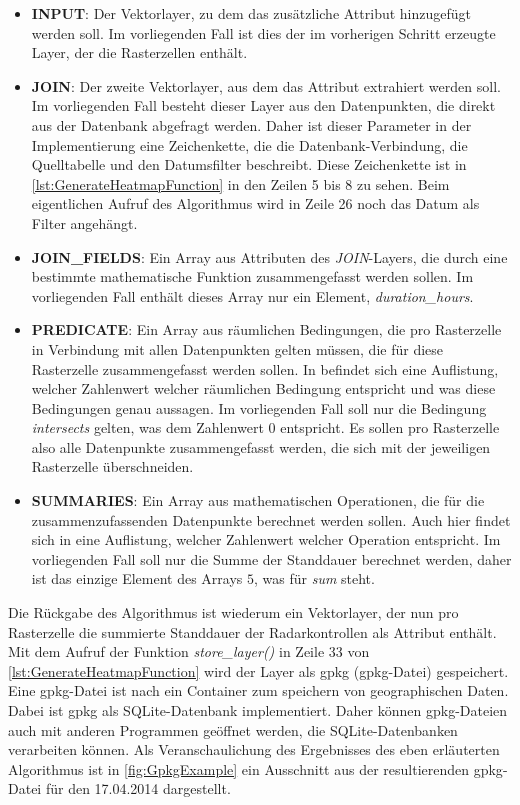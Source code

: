 \begin{itemize}
    \setlength\itemsep{-15pt}
    \item \textbf{INPUT}: Der Vektorlayer, zu dem das zusätzliche Attribut hinzugefügt werden soll. Im vorliegenden Fall ist dies der im vorherigen Schritt erzeugte Layer, der die Rasterzellen enthält.
    \item \textbf{JOIN}: Der zweite Vektorlayer, aus dem das Attribut extrahiert werden soll. Im vorliegenden Fall besteht dieser Layer aus den Datenpunkten, die direkt aus der Datenbank abgefragt werden. Daher ist dieser Parameter in der Implementierung eine Zeichenkette, die die Datenbank-Verbindung, die Quelltabelle und den Datumsfilter beschreibt. Diese Zeichenkette ist in \autoref{lst:GenerateHeatmapFunction} in den Zeilen 5 bis 8 zu sehen. Beim eigentlichen Aufruf des Algorithmus wird in Zeile 26 noch das Datum als Filter angehängt.
    \item \textbf{JOIN\_FIELDS}: Ein Array aus Attributen des \emph{JOIN}-Layers, die durch eine bestimmte mathematische Funktion zusammengefasst werden sollen. Im vorliegenden Fall enthält dieses Array nur ein Element, \emph{duration\_hours}.
    \item \textbf{PREDICATE}: Ein Array aus räumlichen Bedingungen, die pro Rasterzelle in Verbindung mit allen Datenpunkten gelten müssen, die für diese Rasterzelle zusammengefasst werden sollen. In \cite{QgisJoinByLocationSummary} befindet sich eine Auflistung, welcher Zahlenwert welcher räumlichen Bedingung entspricht und was diese Bedingungen genau aussagen. Im vorliegenden Fall soll nur die Bedingung \emph{intersects} gelten, was dem Zahlenwert $0$ entspricht. Es sollen pro Rasterzelle also alle Datenpunkte zusammengefasst werden, die sich mit der jeweiligen Rasterzelle überschneiden.
    \item \textbf{SUMMARIES}: Ein Array aus mathematischen Operationen, die für die zusammenzufassenden Datenpunkte berechnet werden sollen. Auch hier findet sich in \cite{QgisJoinByLocationSummary} eine Auflistung, welcher Zahlenwert welcher Operation entspricht. Im vorliegenden Fall soll nur die Summe der Standdauer berechnet werden, daher ist das einzige Element des Arrays $5$, was für \emph{sum} steht.
\end{itemize}

Die Rückgabe des Algorithmus ist wiederum ein Vektorlayer, der nun pro Rasterzelle die summierte Standdauer der Radarkontrollen als Attribut enthält.
Mit dem Aufruf der Funktion \emph{store\_layer()} in Zeile 33 von \autoref{lst:GenerateHeatmapFunction} wird der Layer als \acrlong{gpkg} (\acrshort{gpkg}-Datei) gespeichert.
Eine \acrshort{gpkg}-Datei ist nach \cite{GPKG} ein Container zum speichern von geographischen Daten.
Dabei ist \acrshort{gpkg} als SQLite-Datenbank implementiert.
Daher können \acrshort{gpkg}-Dateien auch mit anderen Programmen geöffnet werden, die SQLite-Datenbanken verarbeiten können.
Als Veranschaulichung des Ergebnisses des eben erläuterten Algorithmus ist in \autoref{fig:GpkgExample} ein Ausschnitt aus der resultierenden \acrshort{gpkg}-Datei für den 17.04.2014 dargestellt.

